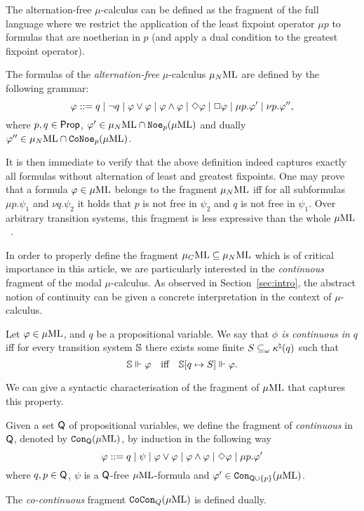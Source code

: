 The alternation-free $\mu$-calculus can be defined as the fragment of the full
language where we restrict the application of the least fixpoint operator $\mu
p$ to formulas that are noetherian in $p$ (and apply a dual condition to the 
greatest fixpoint operator).

\begin{definition}
The formulas of the \emph{alternation-free} $\mu$-calculus $\mu_{N}\mathrm{ML}$ 
are defined by the following grammar:
\begin{equation*}
   \varphi \mathrel{::=}  
      q \mid \neg q  
   \mid \varphi\lor\varphi \mid \varphi\land\varphi 
      \mid \Diamond \varphi
       \mid \Box \varphi
   \mid \mu p. \varphi'    
   \mid \nu p. \varphi'',
\end{equation*} 
where $p,q \in \mathsf{Prop}$, $\varphi' \in \mu_{N}\mathrm{ML} \cap \mathtt{Noe}_{p}(\mu\mathrm{ML})$
and dually $\varphi'' \in \mu_{N}\mathrm{ML} \cap \mathtt{CoNoe}_{p}(\mu\mathrm{ML})$.
\end{definition}

It is then immediate to verify that the above definition indeed captures exactly
all formulas without alternation of least and greatest fixpoints.
One may prove that 
a formula $\varphi \in \mu\mathrm{ML}$ belongs to the fragment $\mu_{N}\mathrm{ML}$ iff for all 
subformulas $\mu p.\psi_1$ and $\nu q.\psi_2$ it holds that $p$ is not free in
$\psi_2$ and $q$ is not free in $\psi_1$.
%
Over arbitrary transition systems, this fragment is less expressive than the 
whole $\mu\mathrm{ML}$~\cite{Park79}. 

In order to properly define the fragment $\mu_{C}\mathrm{ML} \subseteq \mu_{N}\mathrm{ML}$ which is of
critical importance in this article, we are particularly interested in the 
\emph{continuous} fragment of the modal $\mu$-calculus. 
As observed in Section~\ref{sec:intro}, the abstract notion of continuity can 
be given a concrete interpretation in the context of $\mu$-calculus.
%
\begin{definition}
Let $\varphi \in \mu\mathrm{ML}$, and $q$ be a propositional variable. 
We say that \emph{$\phi$ is continuous in $q$} iff for every transition 
system $\mathbb{S}$ there exists some finite $S \subseteq_\omega \kappa^\natural(q)$ such that
$$
\bbS \mmodels \phi \quad\text{iff}\quad \bbS[q \mapsto S] \mmodels \phi.
$$
\end{definition}

We can give a syntactic characterisation of the fragment of $\mu\mathrm{ML}$ that captures
this property. 

\begin{definition}
Given a set $\mathsf{Q}$ of propositional variables, we define the fragment of \muML 
\emph{continuous} in $\mathsf{Q}$, denoted by $\mathtt{Con}_{\mathsf{Q}}(\mu\mathrm{ML})$, by induction 
in the following way
\begin{equation*}
   \varphi \mathrel{::=}  q
   \mid \psi
   \mid \varphi \lor \varphi
   \mid \varphi \land \varphi
   \mid \Diamond \varphi
   \mid \mu p.\varphi'
\end{equation*}
%
where $q,p \in \mathsf{Q}$, $\psi$ is a $\mathsf{Q}$-free $\mu\mathrm{ML}$-formula and 
$\varphi' \in \mathtt{Con}_{\mathsf{Q}\cup\{p\}}(\mu\mathrm{ML})$.

The  \emph{co-continuous} fragment $\mathtt{CoCon}_{Q}(\mu\mathrm{ML})$ is defined dually. 
\end{definition}

